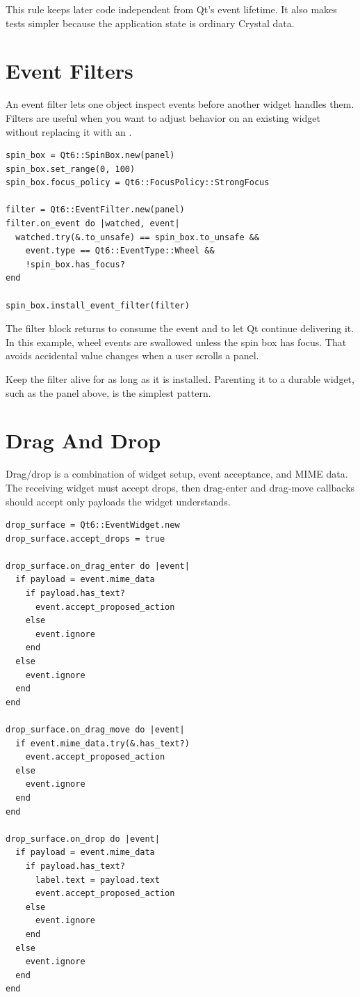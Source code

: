 This rule keeps later code independent from Qt's event lifetime. It also makes tests simpler because the application state is ordinary Crystal data.

\section{Event Filters}

An event filter lets one object inspect events before another widget handles them. Filters are useful when you want to adjust behavior on an existing widget without replacing it with an .

\begin{lstlisting}[style=crystal]
spin_box = Qt6::SpinBox.new(panel)
spin_box.set_range(0, 100)
spin_box.focus_policy = Qt6::FocusPolicy::StrongFocus

filter = Qt6::EventFilter.new(panel)
filter.on_event do |watched, event|
  watched.try(&.to_unsafe) == spin_box.to_unsafe &&
    event.type == Qt6::EventType::Wheel &&
    !spin_box.has_focus?
end

spin_box.install_event_filter(filter)
\end{lstlisting}

The filter block returns  to consume the event and  to let Qt continue delivering it. In this example, wheel events are swallowed unless the spin box has focus. That avoids accidental value changes when a user scrolls a panel.

Keep the filter alive for as long as it is installed. Parenting it to a durable widget, such as the panel above, is the simplest pattern.

\section{Drag And Drop}

Drag/drop is a combination of widget setup, event acceptance, and MIME data. The receiving widget must accept drops, then drag-enter and drag-move callbacks should accept only payloads the widget understands.

\begin{lstlisting}[style=crystal]
drop_surface = Qt6::EventWidget.new
drop_surface.accept_drops = true

drop_surface.on_drag_enter do |event|
  if payload = event.mime_data
    if payload.has_text?
      event.accept_proposed_action
    else
      event.ignore
    end
  else
    event.ignore
  end
end

drop_surface.on_drag_move do |event|
  if event.mime_data.try(&.has_text?)
    event.accept_proposed_action
  else
    event.ignore
  end
end

drop_surface.on_drop do |event|
  if payload = event.mime_data
    if payload.has_text?
      label.text = payload.text
      event.accept_proposed_action
    else
      event.ignore
    end
  else
    event.ignore
  end
end
\end{lstlisting}

